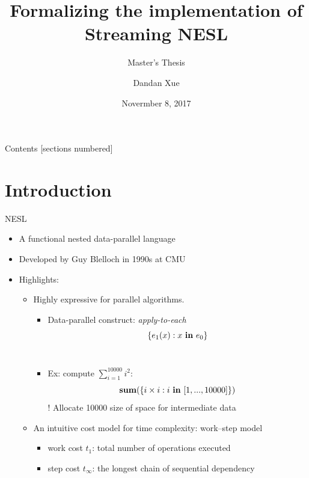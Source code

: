 \documentclass{beamer}
\title{Formalizing the implementation of \\ Streaming NESL}
\subtitle{Master's Thesis}
\author{Dandan Xue}
\date{Novermber 8, 2017}
\institute{Department of Computer Science (DIKU) \\ University of Copenhagen}
\begin{document}
\maketitle

\begin{frame}{Contents}
[sections numbered]
\tableofcontents[hideallsubsections]
\end{frame}


\section{Introduction}

\begin{frame}{NESL}

	\begin{itemize}
		\item A functional nested data-parallel language
		\item Developed by Guy Blelloch in 1990s at CMU
		\item Highlights: 
		\begin{itemize}
			\item Highly expressive for parallel algorithms. \\ 
			\begin{itemize}
			
			\item Data-parallel construct: \emph{apply-to-each} $$\{e_1(x) : x \ \mathbf{in} \ e_0 \} $$\\ 
	  \item Ex: compute $\sum_{i=1}^{10000}i^2$:
	  $$\*{sum}(\{i \times i: i \ \*{in}  \ [1,...,10000]\})$$
	  ! Allocate {\color{blue} 10000} size of space for intermediate data
  		\end{itemize}
	  \item An intuitive cost model for time complexity: work--step model
	  \begin{itemize}
	  	\item work cost $t_1$: total number of operations executed
	  	\item step cost $t_\infty$: the longest chain of sequential dependency
	  \end{itemize}
	\end{itemize}
	\end{itemize}
  
\end{frame}
\end{document}
